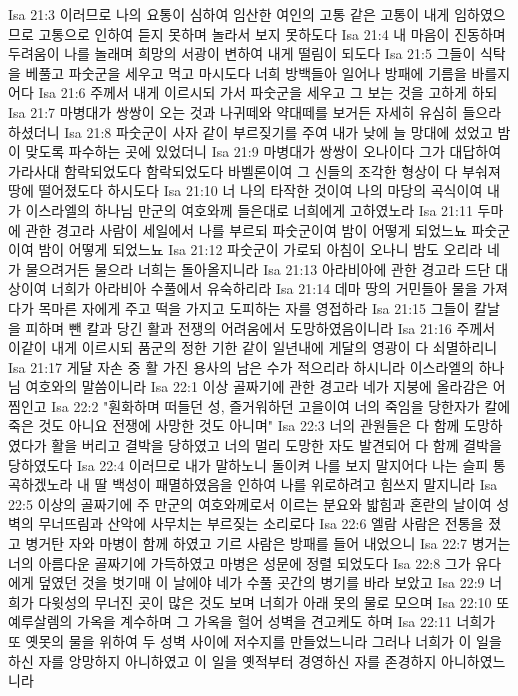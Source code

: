 Isa 21:3  이러므로 나의 요통이 심하여 임산한 여인의 고통 같은 고통이 내게 임하였으므로 고통으로 인하여 듣지 못하며 놀라서 보지 못하도다
Isa 21:4  내 마음이 진동하며 두려움이 나를 놀래며 희망의 서광이 변하여 내게 떨림이 되도다
Isa 21:5  그들이 식탁을 베풀고 파숫군을 세우고 먹고 마시도다 너희 방백들아 일어나 방패에 기름을 바를지어다
Isa 21:6  주께서 내게 이르시되 가서 파숫군을 세우고 그 보는 것을 고하게 하되
Isa 21:7  마병대가 쌍쌍이 오는 것과 나귀떼와 약대떼를 보거든 자세히 유심히 들으라 하셨더니
Isa 21:8  파숫군이 사자 같이 부르짖기를 주여 내가 낮에 늘 망대에 섰었고 밤이 맞도록 파수하는 곳에 있었더니
Isa 21:9  마병대가 쌍쌍이 오나이다 그가 대답하여 가라사대 함락되었도다 함락되었도다 바벨론이여 그 신들의 조각한 형상이 다 부숴져 땅에 떨어졌도다 하시도다
Isa 21:10  너 나의 타작한 것이여 나의 마당의 곡식이여 내가 이스라엘의 하나님 만군의 여호와께 들은대로 너희에게 고하였노라
Isa 21:11  두마에 관한 경고라 사람이 세일에서 나를 부르되 파숫군이여 밤이 어떻게 되었느뇨 파숫군이여 밤이 어떻게 되었느뇨
Isa 21:12  파숫군이 가로되 아침이 오나니 밤도 오리라 네가 물으려거든 물으라 너희는 돌아올지니라
Isa 21:13  아라비아에 관한 경고라 드단 대상이여 너희가 아라비아 수풀에서 유숙하리라
Isa 21:14  데마 땅의 거민들아 물을 가져다가 목마른 자에게 주고 떡을 가지고 도피하는 자를 영접하라
Isa 21:15  그들이 칼날을 피하며 뺀 칼과 당긴 활과 전쟁의 어려움에서 도망하였음이니라
Isa 21:16  주께서 이같이 내게 이르시되 품군의 정한 기한 같이 일년내에 게달의 영광이 다 쇠멸하리니
Isa 21:17  게달 자손 중 활 가진 용사의 남은 수가 적으리라 하시니라 이스라엘의 하나님 여호와의 말씀이니라
Isa 22:1  이상 골짜기에 관한 경고라 네가 지붕에 올라감은 어찜인고
Isa 22:2  "훤화하며 떠들던 성, 즐거워하던 고을이여 너의 죽임을 당한자가 칼에 죽은 것도 아니요 전쟁에 사망한 것도 아니며"
Isa 22:3  너의 관원들은 다 함께 도망하였다가 활을 버리고 결박을 당하였고 너의 멀리 도망한 자도 발견되어 다 함께 결박을 당하였도다
Isa 22:4  이러므로 내가 말하노니 돌이켜 나를 보지 말지어다 나는 슬피 통곡하겠노라 내 딸 백성이 패멸하였음을 인하여 나를 위로하려고 힘쓰지 말지니라
Isa 22:5  이상의 골짜기에 주 만군의 여호와께로서 이르는 분요와 밟힘과 혼란의 날이여 성벽의 무너뜨림과 산악에 사무치는 부르짖는 소리로다
Isa 22:6  엘람 사람은 전통을 졌고 병거탄 자와 마병이 함께 하였고 기르 사람은 방패를 들어 내었으니
Isa 22:7  병거는 너의 아름다운 골짜기에 가득하였고 마병은 성문에 정렬 되었도다
Isa 22:8  그가 유다에게 덮였던 것을 벗기매 이 날에야 네가 수풀 곳간의 병기를 바라 보았고
Isa 22:9  너희가 다윗성의 무너진 곳이 많은 것도 보며 너희가 아래 못의 물로 모으며
Isa 22:10  또 예루살렘의 가옥을 계수하며 그 가옥을 헐어 성벽을 견고케도 하며
Isa 22:11  너희가 또 옛못의 물을 위하여 두 성벽 사이에 저수지를 만들었느니라 그러나 너희가 이 일을 하신 자를 앙망하지 아니하였고 이 일을 옛적부터 경영하신 자를 존경하지 아니하였느니라
